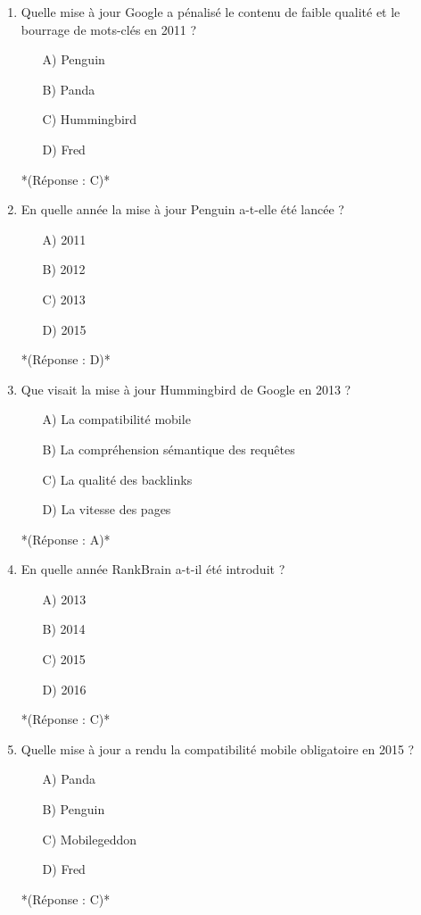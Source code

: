 \documentclass[12pt,a4paper,twoside]{report}
\begin{document}
\begin{enumerate}
\item Quelle mise à jour Google a pénalisé le contenu de faible qualité et le bourrage de mots-clés en 2011 ?
\begin{itemize}
\item[A)] Penguin
\item[B)] Panda
\item[C)] Hummingbird
\item[D)] Fred
\end{itemize}
*(Réponse : C)*

\item En quelle année la mise à jour Penguin a-t-elle été lancée ?
\begin{itemize}
\item[A)] 2011
\item[B)] 2012
\item[C)] 2013
\item[D)] 2015
\end{itemize}
*(Réponse : D)*

\item Que visait la mise à jour Hummingbird de Google en 2013 ?
\begin{itemize}
\item[A)] La compatibilité mobile
\item[B)] La compréhension sémantique des requêtes
\item[C)] La qualité des backlinks
\item[D)] La vitesse des pages
\end{itemize}
*(Réponse : A)*

\item En quelle année RankBrain a-t-il été introduit ?
\begin{itemize}
\item[A)] 2013
\item[B)] 2014
\item[C)] 2015
\item[D)] 2016
\end{itemize}
*(Réponse : C)*

\item Quelle mise à jour a rendu la compatibilité mobile obligatoire en 2015 ?
\begin{itemize}
\item[A)] Panda
\item[B)] Penguin
\item[C)] Mobilegeddon
\item[D)] Fred
\end{itemize}
*(Réponse : C)*


\end{enumerate}
\end{document}
